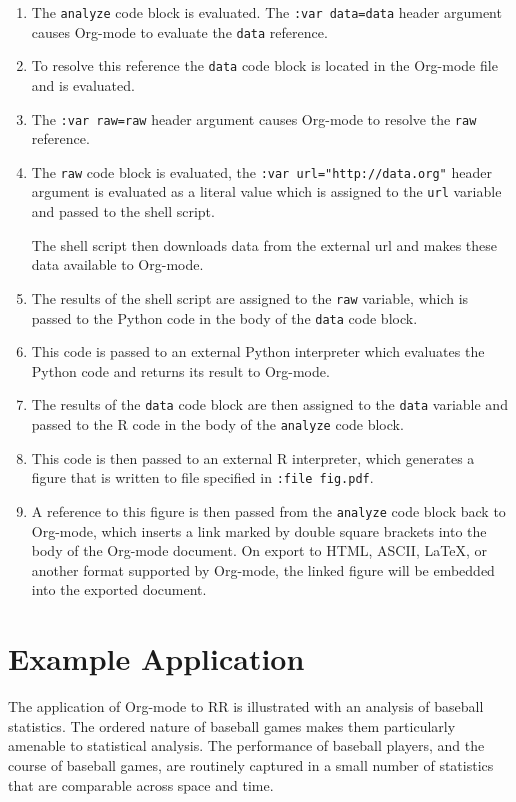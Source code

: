 \documentclass[11pt]{article}
\begin{document}
\begin{enumerate}
\item The \texttt{analyze} code block is evaluated.  The \texttt{:var data=data} header
   argument causes Org-mode to evaluate the \texttt{data} reference.
\item To resolve this reference the \texttt{data} code block is located in the
   Org-mode file and is evaluated.
\item The \texttt{:var raw=raw} header argument causes Org-mode to resolve the
   \texttt{raw} reference.
\item The \texttt{raw} code block is evaluated, the \texttt{:var url="http://data.org"}
   header argument is evaluated as a literal value which is assigned
   to the \texttt{url} variable and passed to the shell script.

   The shell script then downloads data from the external url and
   makes these data available to Org-mode.
\item The results of the shell script are assigned to the \texttt{raw} variable,
   which is passed to the Python code in the body of the \texttt{data} code
   block.
\item This code is passed to an external Python interpreter which
   evaluates the Python code and returns its result to Org-mode.
\item The results of the \texttt{data} code block are then assigned to the
   \texttt{data} variable and passed to the R code in the body of the
   \texttt{analyze} code block.
\item This code is then passed to an external R interpreter, which
   generates a figure that is written to file specified in \texttt{:file fig.pdf}.
\item A reference to this figure is then passed from the \texttt{analyze} code
   block back to Org-mode, which inserts a link marked by double
   square brackets into the body of the Org-mode document.  On export
   to HTML, ASCII, \LaTeX{}, or another format supported by Org-mode,
   the linked figure will be embedded into the exported document.
\end{enumerate}
\section{Example Application}
\label{sec-4}

The application of Org-mode to RR is illustrated with an
analysis of baseball statistics.  The ordered nature of
baseball games makes them particularly amenable to statistical
analysis.  The performance of baseball players, and the course of
baseball games, are routinely captured in a small number of statistics
that are comparable across space and time.
\end{document}
